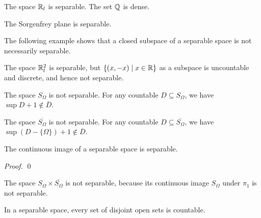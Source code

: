 \begin{example}
    The space $\mathbb{R}_l$ is separable. The set $\mathbb{Q}$ is dense.
\end{example}

\begin{corollary}
    The Sorgenfrey plane is separable.
\end{corollary}

The following example shows that a closed subspace of a separable space is not
necessarily separable.
\begin{example}[AC]
    The space $\mathbb{R}_l^2$ is separable, but $\{ (x, -x) \mid x \in \mathbb{R} \}$ as a
    subspace is uncountable and discrete, and hence not separable.
\end{example}

\begin{example}
    The space $S_\Omega$ is not separable. For any countable $D \subseteq S_\Omega$,
    we have $\sup D + 1 \notin \overline{D}$.
\end{example}

\begin{example}    
    The space $\overline{S_\Omega}$ is not separable. For any countable $D
    \subseteq \overline{S_\Omega}$, we have $\sup (D - \{ \Omega \}) + 1 \notin
    \overline{D}$.
\end{example}

\begin{proposition}
    The continuous image of a separable space is separable.
\end{proposition}

\begin{proof}
    \pf
    \qed
\end{proof}

\begin{example}
    The space $S_\Omega \times \overline{S_\Omega}$ is not separable, because its continuous image $S_\Omega$
    under $\pi_1$ is not separable.
\end{example}

\begin{proposition}[Choice]
    In a separable space, every set of disjoint open sets is countable.
\end{proposition}

